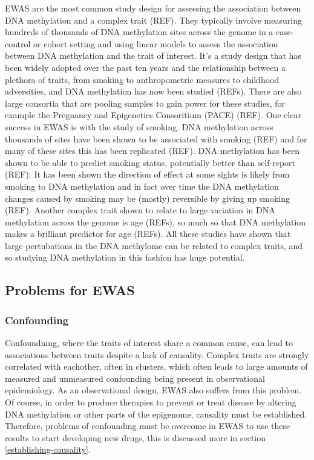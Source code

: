 \documentclass[11pt,twoside]{bristolthesis}
\begin{document}
EWAS are the most common study design for assessing the association between DNA methylation and a complex trait (REF). They typically involve measuring hundreds of thousands of DNA methylation sites across the genome in a case-control or cohort setting and using linear models to assess the association between DNA methylation and the trait of interest. It's a study design that has been widely adopted over the past ten years and the relationship between a plethora of traits, from smoking to anthropometric measures to childhood adversities, and DNA methylation has now been studied (REFs). There are also large consortia that are pooling samples to gain power for these studies, for example the Pregnancy and Epigenetics Consoritium (PACE) (REF). One clear success in EWAS is with the study of smoking. DNA methylation across thousands of sites have been shown to be associated with smoking (REF) and for many of these sites this has been replicated (REF). DNA methylation has been shown to be able to predict smoking status, potentially better than self-report (REF). It has been shown the direction of effect at some sights is likely from smoking to DNA methylation and in fact over time the DNA methylation changes caused by smoking may be (mostly) reversible by giving up smoking (REF). Another complex trait shown to relate to large variation in DNA methylation across the genome is age (REFs), so much so that DNA methylation makes a brilliant predictor for age (REFs). All these studies have shown that large pertubations in the DNA methylome can be related to complex traits, and so studying DNA methylation in this fashion has huge potential.

\hypertarget{problems-for-ewas}{%
\subsection{Problems for EWAS}\label{problems-for-ewas}}

\hypertarget{confounding}{%
\subsubsection{Confounding}\label{confounding}}

Confoundning, where the traits of interest share a common cause, can lead to associations between traits despite a lack of causality. Complex traits are strongly correlated with eachother, often in clusters, which often leads to large amounts of measured and unmeasured confounding being present in observational epidemiology. As an observational design, EWAS also suffers from this problem. Of course, in order to produce therapies to prevent or treat disease by altering DNA methylation or other parts of the epigenome, causality must be established. Therefore, problems of confounding must be overcome in EWAS to use these results to start developing new drugs, this is discussed more in section \ref{establishing-causality}.
\end{document}
